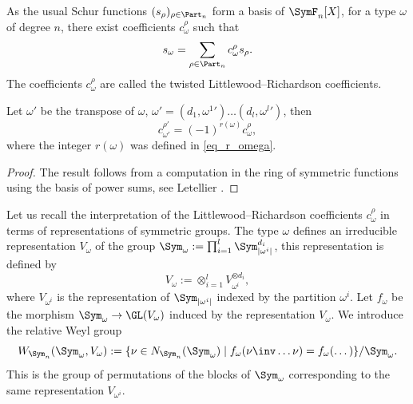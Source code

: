 \begin{definition}\label{def_twisted_c}
As the usual Schur functions $(s_{\rho})_{\rho\in \Part_n}$ form a basis of $\SymF_n [X]$, for a type $\omega$ of degree $n$, there exist coefficients $c_{\omega}^{\rho}$ such that
\[
s_{\omega} = \sum_{\rho\in\Part_n} c^{\rho}_{\omega} s_{\rho}.
\]
The coefficients $c_{\omega}^{\rho}$ are called the twisted Littlewood--Richardson coefficients.
\end{definition}
\begin{lemma}\label{lemma_transpose_r_omega}
Let $\omega'$ be the transpose of $\omega$, \ie $\omega'=(d_1,{\omega^1}')\dots(d_l,{\omega^l}')$, then
\[
c^{\rho'}_{\omega'}=(-1)^{r(\omega)} c^{\rho}_{\omega},
\]
where the integer $r(\omega)$ was defined in \eqref{eq_r_omega}.
\end{lemma}
\begin{proof}
The result follows from a computation in the ring of symmetric functions using the basis of power sums, see Letellier \cite[6.2.4]{Letellier_gl}.
\end{proof}

Let us recall the interpretation of the Littlewood--Richardson coefficients $c_{\omega}^{\rho}$ in terms of representations of symmetric groups. The type $\omega$ defines an irreducible representation $V_{\omega}$ of the group $\Sym_{\omega}:=\prod_{i=1}^l \Sym_{|\omega^i|}^{d_i}$, this representation is defined by
\[
V_{\omega}:=\otimes_{i=1}^l V_{\omega^i}^{\otimes d_i},
\]
where $V_{\omega^i}$ is the representation of $\Sym_{|\omega^i|}$ indexed by the partition $\omega^i$. Let $f_{\omega}$ be the morphism $\Sym_{\omega}\to \GL(V_{\omega})$ induced by the representation $V_{\omega}$. We introduce the relative Weyl group
\[
W_{\Sym_n}(\Sym_{\omega},V_{\omega}) :=\lbrace \nu \in N_{\Sym_n}(\Sym_{\omega}) \mid f_{\omega}(\nu\inv \dots \nu) = f_{\omega}(\dots)\rbrace/ \Sym_{\omega}.
\]
This is the group of permutations of the blocks of $\Sym_{\omega}$ corresponding to the same representation $V_{\omega^i}$.

